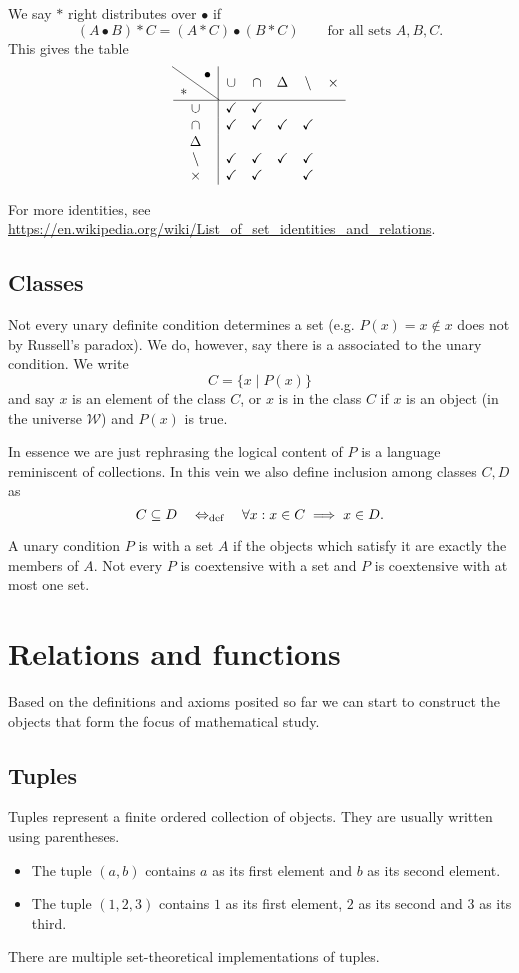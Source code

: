 \begin{lemma}
We say $*$ right distributes over $\bullet$ if
\[ (A\bullet B)*C = (A*C)\bullet (B*C) \qquad\text{for all sets $A,B,C$.} \]
This gives the table
\[ \begin{array}{c | c c c c c}
\text{\diagbox{$*$}{$\bullet$}} & \cup & \cap & \symdiff & \setminus & \times \\ \hline
\cup & \checkmark & \checkmark &  & & \\
\cap & \checkmark & \checkmark & \checkmark & \checkmark & \\
\symdiff &  &  &  & & \\
\setminus & \checkmark & \checkmark & \checkmark & \checkmark & \\
\times & \checkmark & \checkmark &  & \checkmark &
\end{array} \]
\end{lemma}

For more identities, see \url{https://en.wikipedia.org/wiki/List_of_set_identities_and_relations}.

\section{Classes}
Not every unary definite condition determines a set (e.g. $P(x) = x\notin x$ does not by Russell's paradox). We do, however, say there is a  associated to the unary condition. We write
\[ C = \{ x\;|\; P(x) \} \]
and say $x$ is an element of the class $C$, or $x$ is in the class $C$ if $x$ is an object (in the universe $\mathcal{W}$) and $P(x)$ is true.

In essence we are just rephrasing the logical content of $P$ is a language reminiscent of collections. In this vein we also define inclusion among classes $C,D$ as
\[ C\subseteq D \quad\Leftrightarrow_{\text{def}}\quad \forall x: x\in C \implies x\in D. \]

A unary condition $P$ is  with a set $A$ if the objects which satisfy it are exactly the members of $A$. Not every $P$ is coextensive with a set and $P$ is coextensive with at most one set.

\chapter{Relations and functions}
Based on the definitions and axioms posited so far we can start to construct the objects that form the focus of mathematical study.
\section{Tuples}
Tuples represent a finite ordered collection of objects. They are usually written using parentheses.
\begin{example}
\begin{itemize}
\item The tuple $(a,b)$ contains $a$ as its first element and $b$ as its second element.
\item The tuple $(1,2,3)$ contains $1$ as its first element, $2$ as its second and $3$ as its third.
\end{itemize}
\end{example}
There are multiple set-theoretical implementations of tuples.

